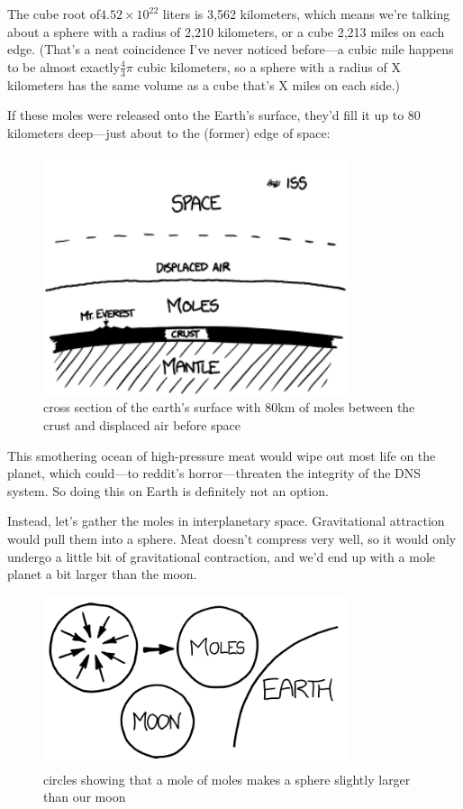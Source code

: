 {The cube root of\( 4.52\times10^{22}\) liters is 3,562 kilometers, which means we’re talking about a sphere with a radius of 2,210 kilometers, or a cube 2,213 miles on each edge. (That’s a neat coincidence I’ve never noticed before—a cubic mile happens to be almost exactly\(\frac{4}{3}\pi\) cubic kilometers, so a sphere with a radius of X kilometers has the same volume as a cube that’s X miles on each side.)}

{If these moles were released onto the Earth’s surface, they’d fill it up to 80 kilometers deep—just about to the (former) edge of space:}

\begin{figure}[!htbp]
\centering
\includegraphics[scale=0.5, max width=0.8\textwidth]{imgs/a/4/moles_layers.png}
\caption{cross section of the earth's surface with 80km of moles between the crust and displaced air before space}
\end{figure}

{This smothering ocean of high-pressure meat would wipe out most life on the planet, which could—to reddit’s horror—threaten the integrity of the DNS system. So doing this on Earth is definitely not an option.}

{Instead, let’s gather the moles in interplanetary space. Gravitational attraction would pull them into a sphere. Meat doesn’t compress very well, so it would only undergo a little bit of gravitational contraction, and we’d end up with a mole planet a bit larger than the moon.}

\begin{figure}[!htbp]
\centering
\includegraphics[scale=0.5, max width=0.8\textwidth]{imgs/a/4/moles_scale.png}
\caption{circles showing that a mole of moles makes a sphere slightly larger than our moon}
\end{figure}

